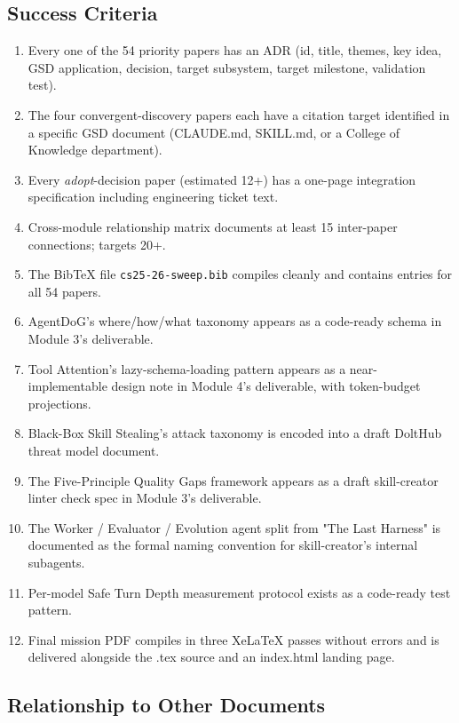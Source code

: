 \documentclass[11pt,letterpaper]{article}
\begin{document}
\subsection{Success Criteria}

\begin{enumerate}[leftmargin=*]
\item Every one of the 54 priority papers has an ADR (id, title, themes, key idea, GSD application, decision, target subsystem, target milestone, validation test).
\item The four convergent-discovery papers each have a citation target identified in a specific GSD document (CLAUDE.md, SKILL.md, or a College of Knowledge department).
\item Every \textit{adopt}-decision paper (estimated 12+) has a one-page integration specification including engineering ticket text.
\item Cross-module relationship matrix documents at least 15 inter-paper connections; targets 20+.
\item The BibTeX file \texttt{cs25-26-sweep.bib} compiles cleanly and contains entries for all 54 papers.
\item AgentDoG's where/how/what taxonomy appears as a code-ready schema in Module 3's deliverable.
\item Tool Attention's lazy-schema-loading pattern appears as a near-implementable design note in Module 4's deliverable, with token-budget projections.
\item Black-Box Skill Stealing's attack taxonomy is encoded into a draft DoltHub threat model document.
\item The Five-Principle Quality Gaps framework appears as a draft skill-creator linter check spec in Module 3's deliverable.
\item The Worker / Evaluator / Evolution agent split from "The Last Harness" is documented as the formal naming convention for skill-creator's internal subagents.
\item Per-model Safe Turn Depth measurement protocol exists as a code-ready test pattern.
\item Final mission PDF compiles in three XeLaTeX passes without errors and is delivered alongside the .tex source and an index.html landing page.
\end{enumerate}

\subsection{Relationship to Other Documents}
\end{document}

